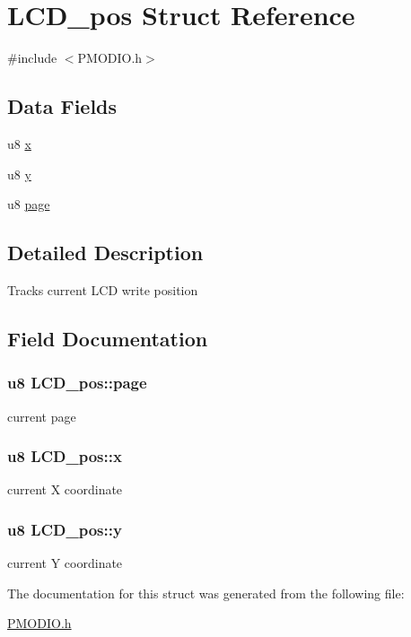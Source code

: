 \hypertarget{structLCD__pos}{\section{L\-C\-D\-\_\-pos Struct Reference}
\label{structLCD__pos}
}


{\ttfamily \#include $<$P\-M\-O\-D\-I\-O.\-h$>$}

\subsection*{Data Fields}
\begin{DoxyCompactItemize}
\item 
u8 \hyperlink{structLCD__pos_a051308ffa36addadedfbb5dd48e4194c}{x}
\item 
u8 \hyperlink{structLCD__pos_a6c4f4a3957c2e6dd3f26c6bda4d8f19c}{y}
\item 
u8 \hyperlink{structLCD__pos_a1f2fc7bc287277e57c1d42d32cc7f4f6}{page}
\end{DoxyCompactItemize}


\subsection{Detailed Description}
Tracks current L\-C\-D write position 

\subsection{Field Documentation}
\hypertarget{structLCD__pos_a1f2fc7bc287277e57c1d42d32cc7f4f6}{
\subsubsection[{page}]{\setlength{\rightskip}{0pt plus 5cm}u8 L\-C\-D\-\_\-pos\-::page}}\label{structLCD__pos_a1f2fc7bc287277e57c1d42d32cc7f4f6}
current page \hypertarget{structLCD__pos_a051308ffa36addadedfbb5dd48e4194c}{
\subsubsection[{x}]{\setlength{\rightskip}{0pt plus 5cm}u8 L\-C\-D\-\_\-pos\-::x}}\label{structLCD__pos_a051308ffa36addadedfbb5dd48e4194c}
current X coordinate \hypertarget{structLCD__pos_a6c4f4a3957c2e6dd3f26c6bda4d8f19c}{
\subsubsection[{y}]{\setlength{\rightskip}{0pt plus 5cm}u8 L\-C\-D\-\_\-pos\-::y}}\label{structLCD__pos_a6c4f4a3957c2e6dd3f26c6bda4d8f19c}
current Y coordinate 

The documentation for this struct was generated from the following file\-:\begin{DoxyCompactItemize}
\item 
\hyperlink{PMODIO_8h}{P\-M\-O\-D\-I\-O.\-h}\end{DoxyCompactItemize}
